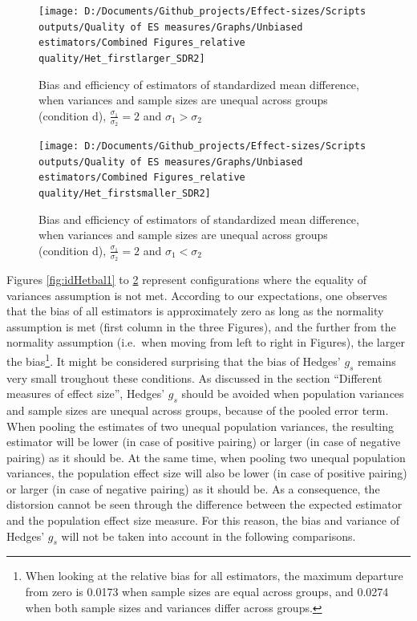 \documentclass[
  man,floatsintext]{apa6}
\begin{document}
\begin{figure}

{\centering \texttt{[image: D:/Documents/Github\_projects/Effect-sizes/Scripts outputs/Quality of ES measures/Graphs/Unbiased estimators/Combined Figures\_relative quality/Het\_firstlarger\_SDR2]} 

}

\caption{Bias and efficiency of estimators of standardized mean difference, when variances and sample sizes are unequal across groups (condition d), $\frac{\sigma_1}{\sigma_2}=2$ and $\sigma_1>\sigma_2$}\label{fig:idHetunbal3}
\end{figure}

\begin{figure}

{\centering \texttt{[image: D:/Documents/Github\_projects/Effect-sizes/Scripts outputs/Quality of ES measures/Graphs/Unbiased estimators/Combined Figures\_relative quality/Het\_firstsmaller\_SDR2]} 

}

\caption{Bias and efficiency of estimators of standardized mean difference, when variances and sample sizes are unequal across groups (condition d), $\frac{\sigma_1}{\sigma_2}=2$ and $\sigma_1<\sigma_2$}\label{fig:idHetunbal4}
\end{figure}

Figures \ref{fig:idHetbal1} to \ref{fig:idHetunbal4} represent configurations where the equality of variances assumption is not met. According to our expectations, one observes that the bias of all estimators is approximately zero as long as the normality assumption is met (first column in the three Figures), and the further from the normality assumption (i.e.~when moving from left to right in Figures), the larger the bias\footnote{When looking at the relative bias for all estimators, the maximum departure from zero is 0.0173 when sample sizes are equal across groups, and 0.0274 when both sample sizes and variances differ across groups.}. It might be considered surprising that the bias of Hedges' \(g_s\) remains very small troughout these conditions. As discussed in the section \enquote{Different measures of effect size}, Hedges' \(g_s\) should be avoided when population variances and sample sizes are unequal across groups, because of the pooled error term. When pooling the estimates of two unequal population variances, the resulting estimator will be lower (in case of positive pairing) or larger (in case of negative pairing) as it should be. At the same time, when pooling two unequal population variances, the population effect size will also be lower (in case of positive pairing) or larger (in case of negative pairing) as it should be. As a consequence, the distorsion cannot be seen through the difference between the expected estimator and the population effect size measure. For this reason, the bias and variance of Hedges' \(g_s\) will not be taken into account in the following comparisons.
\end{document}
